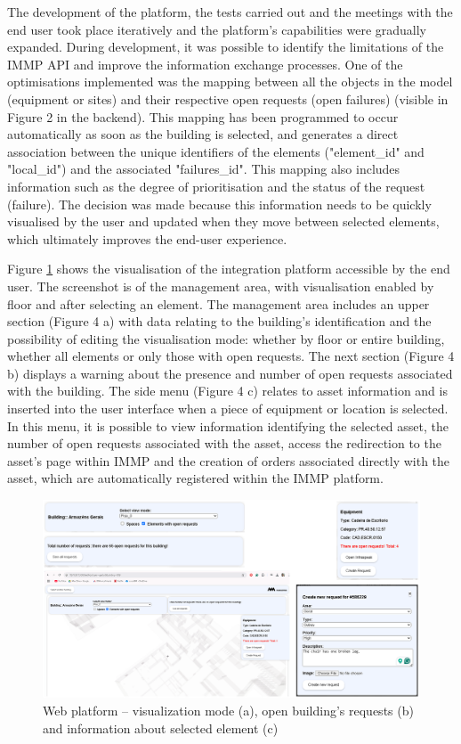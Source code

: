 \documentclass[a4paper, 10pt, twocolumn, twoside]{article}
\begin{document}
The development of the platform, the tests carried out and the meetings with the end user took place iteratively and the platform's capabilities were gradually expanded. During development, it was possible to identify the limitations of the IMMP API and improve the information exchange processes. One of the optimisations implemented was the mapping between all the objects in the model (equipment or sites) and their respective open requests (open failures) (visible in Figure 2 in the backend). This mapping has been programmed to occur automatically as soon as the building is selected, and generates a direct association between the unique identifiers of the elements ("element\_id" and "local\_id") and the associated "failures\_id". This mapping also includes information such as the degree of prioritisation and the status of the request (failure). The decision was made because this information needs to be quickly visualised by the user and updated when they move between selected elements, which ultimately improves the end-user experience.

Figure \ref{fig_plataforma} shows the visualisation of the integration platform accessible by the end user. The screenshot is of the management area, with visualisation enabled by floor and after selecting an element. The management area includes an upper section (Figure 4 a) with data relating to the building's identification and the possibility of editing the visualisation mode: whether by floor or entire building, whether all elements or only those with open requests. The next section (Figure 4 b) displays a warning about the presence and number of open requests associated with the building. The side menu (Figure 4 c) relates to asset information and is inserted into the user interface when a piece of equipment or location is selected. In this menu, it is possible to view information identifying the selected asset, the number of open requests associated with the asset, access the redirection to the asset's page within IMMP and the creation of orders associated directly with the asset, which are automatically registered within the IMMP platform.

\begin{figure}[!htb]
    \centering
    \includegraphics[width=\textwidth]{Images/plataforma_parcial.png}
    \caption{Web platform – visualization mode (a), open building's requests (b) and information about selected element (c)}
    \label{fig_plataforma}
\end{figure}
\end{document}
